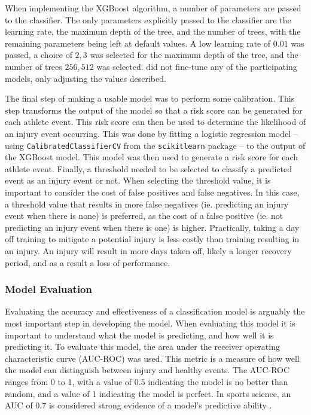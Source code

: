 When implementing the XGBoost algorithm, a number of parameters are passed to the classifier. The only parameters explicitly passed to the classifier are the learning rate, the maximum depth of the tree, and the number of trees, with the remaining parameters being left at default values. A low learning rate of $0.01$ was passed, a choice of ${2, 3}$ was selected for the maximum depth of the tree, and the number of trees ${256, 512}$ was selected. \textcite{Lovdal2021} did not fine-tune any of the participating models, only adjusting the values described.

The final step of making a usable model was to perform some calibration. This step transforms the output of the model so that a risk score can be generated for each athlete event. This risk score can then be used to determine the likelihood of an injury event occurring. This was done by fitting a logistic regression model -- using \texttt{CalibratedClassifierCV} from the \texttt{scikitlearn} package -- to the output of the XGBoost model. This model was then used to generate a risk score for each athlete event. Finally, a threshold needed to be selected to classify a predicted event as an injury event or not. When selecting the threshold value, it is important to consider the cost of false positives and false negatives. In this case, a threshold value that results in more false negatives (ie. predicting an injury event when there is none) is preferred, as the cost of a false positive (ie. not predicting an injury event when there is one) is higher. Practically, taking a day off training to mitigate a potential injury is less costly than training resulting in an injury. An injury will result in more days taken off, likely a longer recovery period, and as a result a loss of performance. 

\subsubsection{Model Evaluation}
Evaluating the accuracy and effectiveness of a classification model is arguably the most important step in developing the model. When evaluating this model it is important to understand what the model is predicting, and how well it is predicting it. To evaluate this model, the area under the receiver operating characteristic curve (AUC-ROC) was used. This metric is a measure of how well the model can distinguish between injury and healthy events. The AUC-ROC ranges from 0 to 1, with a value of 0.5 indicating the model is no better than random, and a value of 1 indicating the model is perfect. In sports science, an AUC of 0.7 is considered strong evidence of a model's predictive ability \cite{Lovdal2021}. 

